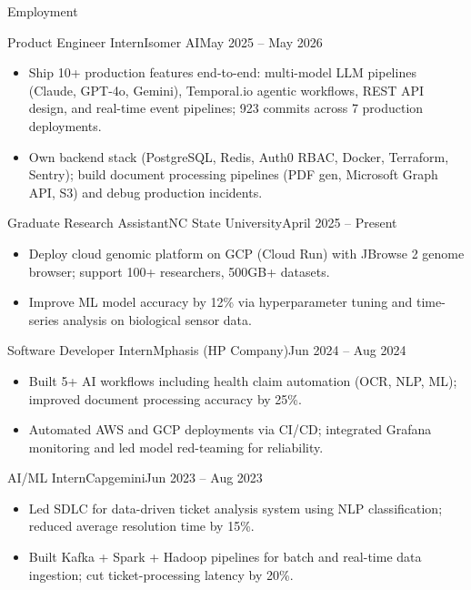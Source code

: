 \documentclass[]{mcdowellcv}
\begin{document}
\makeheader

\begin{cvsection}{Employment}
  \begin{cvsubsection}{Product Engineer Intern}{Isomer AI}{May 2025 -- May 2026}
    \begin{itemize}
      \item Ship 10+ production features end-to-end: multi-model LLM pipelines (Claude, GPT-4o, Gemini), Temporal.io agentic workflows, REST API design, and real-time event pipelines; 923 commits across 7 production deployments.
      \item Own backend stack (PostgreSQL, Redis, Auth0 RBAC, Docker, Terraform, Sentry); build document processing pipelines (PDF gen, Microsoft Graph API, S3) and debug production incidents.
    \end{itemize}
    \vspace{-1.5pt}
  \end{cvsubsection}

  \begin{cvsubsection}{Graduate Research Assistant}{NC State University}{April 2025 -- Present}
    \begin{itemize}
      \item Deploy cloud genomic platform on GCP (Cloud Run) with JBrowse 2 genome browser; support 100+ researchers, 500GB+ datasets.
      \item Improve ML model accuracy by 12\% via hyperparameter tuning and time-series analysis on biological sensor data.
    \end{itemize}
    \vspace{-1.5pt}
  \end{cvsubsection}

  \begin{cvsubsection}{Software Developer Intern}{Mphasis (HP Company)}{Jun 2024 -- Aug 2024}
    \begin{itemize}
      \item Built 5+ AI workflows including health claim automation (OCR, NLP, ML); improved document processing accuracy by 25\%.
      \item Automated AWS and GCP deployments via CI/CD; integrated Grafana monitoring and led model red-teaming for reliability.
    \end{itemize}
    \vspace{-1.5pt}
  \end{cvsubsection}

  \begin{cvsubsection}{AI/ML Intern}{Capgemini}{Jun 2023 -- Aug 2023}
    \begin{itemize}
      \item Led SDLC for data-driven ticket analysis system using NLP classification; reduced average resolution time by 15\%.
      \item Built Kafka + Spark + Hadoop pipelines for batch and real-time data ingestion; cut ticket-processing latency by 20\%.
    \end{itemize}
    \vspace{-1.5pt}
  \end{cvsubsection}
\end{cvsection}
\end{document}
